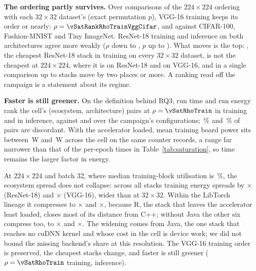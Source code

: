 \textbf{The ordering partly survives.} Over \vSatRankComparisons{} comparisons
of the $224\times224$ ordering with each $32\times32$ dataset's (exact
permutation $p$), VGG-16 training keeps its order or nearly: $\rho = \vSatRankRhoTrainVggCifar$,
\vSatRankRhoTrainVggFashion{} and \vSatRankRhoTrainVggTiny{} against CIFAR-100,
Fashion-MNIST and Tiny ImageNet. ResNet-18 training and inference on both
architectures agree more weakly ($\rho$ down to \vSatRankRhoMin, $p$ up to
\vSatRankPermMax). What moves is the top: \vSatRefBestTrainResnet{}, the
cheapest ResNet-18 stack in training on every $32\times32$ dataset, is not the
cheapest at $224\times224$, where it is \vSatBestTrainResnet{} on ResNet-18 and
\vSatBestTrainVgg{} on VGG-16, and in a single comparison up to
\vSatRankMovedMax{} stacks move by two places or more. A ranking read off the
campaign is a statement about its regime.

\textbf{Faster is still greener.} On the definition behind RQ3, run time and run
energy rank the cell's \vSatRhoCells{} (ecosystem, architecture) pairs at $\rho
= \vSatRhoTrain$ in training and \vSatRhoInfer{} in inference, against
\vSatRefRhoTrain{} and \vSatRefRhoInfer{} over the campaign's configurations;
\vSatDiscordantTrainPct\,\% and \vSatDiscordantInferPct\,\% of pairs are
discordant. With the accelerator loaded, mean training board power sits between
\vSatPowerCounterMin\,\si{\watt} and \vSatPowerCounterMax\,\si{\watt} across the
cell on the same counter records, a range far narrower than that of the
per-epoch times in Table~\ref{tab:saturation}, so time remains the larger factor
in energy.

\begin{tcolorbox}[colback=gray!5!white, colframe=gray!40!black, title=\textbf{Saturation-cell Findings: Does the Spread Survive a Heavier Workload?}]
\small
At $224\times224$ and batch 32, where median training-block utilisation is
\vSatUtilMedian\,\%, the ecosystem spread does not collapse: across all
\vSatEcosystems{} stacks training energy spreads by
\vSatSpreadTrainResnet$\times$ (ResNet-18) and \vSatSpreadTrainVgg$\times$
(VGG-16), wider than at $32\times32$. Within the LibTorch lineage it compresses
to \vSatLibtorchSpreadTrainResnet$\times$ and \vSatLibtorchSpreadTrainVgg$\times$,
because R, the stack that leaves the accelerator least loaded, closes most of
its distance from C++;
without Java the other six compress too, to
\vSatNoJavaSpreadTrainResnet$\times$ and \vSatNoJavaSpreadTrainVgg$\times$.
The widening comes from Java, the one stack that reaches no cuDNN kernel and
whose cost in the cell is device work; we did not bound the missing backend's
share at this resolution. The VGG-16 training order is preserved, the cheapest
stacks change, and faster is still greener ($\rho = \vSatRhoTrain$ training,
\vSatRhoInfer{} inference).
\end{tcolorbox}

